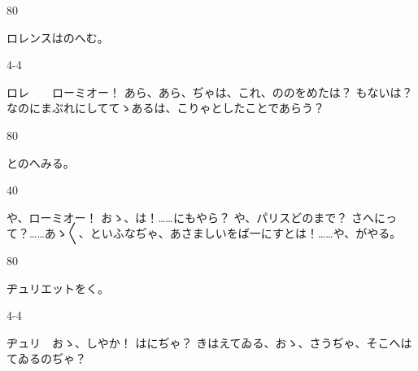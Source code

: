 \documentclass[tate,paper=b6j,jafontsize=9pt]{jlreq}
\begin{document}
\begin{azconvIndented}{8\zw}{0\zw}

ロレンスはのへむ。

\end{azconvIndented}
\begin{azconvIndented}{4\zw}{-4\zw}

ロレ　　ローミオー！ あら、あら、ぢゃは、これ、ののをめたは？ もないは？ なのにまぶれにしててゝあるは、こりゃとしたことであらう？

\end{azconvIndented}
\begin{azconvIndented}{8\zw}{0\zw}

とのへみる。

\end{azconvIndented}
\begin{azconvIndented}{4\zw}{0\zw}

や、ローミオー！ おゝ、は！……にもやら？ や、パリスどのまで？ さへにって？……あゝ{〳〵}、といふなぢゃ、あさましいをば一にすとは！……や、がやる。

\end{azconvIndented}
\begin{azconvIndented}{8\zw}{0\zw}

ヂュリエットをく。

\end{azconvIndented}
\begin{azconvIndented}{4\zw}{-4\zw}

ヂュリ　おゝ、しやか！ はにぢゃ？ きはえてゐる、おゝ、さうぢゃ、そこへはてゐるのぢゃ？

\end{azconvIndented}
\end{document}
